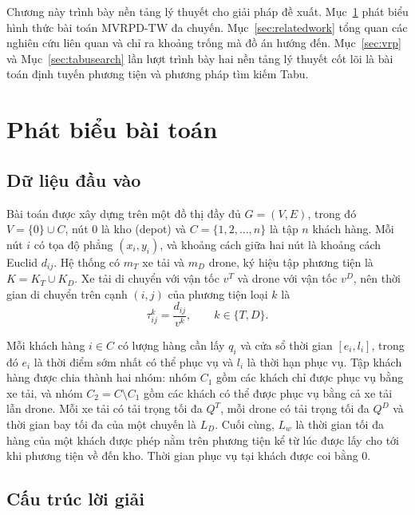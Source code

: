 \documentclass[../DoAn.tex]{subfiles}
\begin{document}
Chương này trình bày nền tảng lý thuyết cho giải pháp đề xuất. Mục~\ref{sec:ngucanh} phát biểu hình thức bài toán MVRPD-TW đa chuyến. Mục~\ref{sec:relatedwork} tổng quan các nghiên cứu liên quan và chỉ ra khoảng trống mà đồ án hướng đến. Mục~\ref{sec:vrp} và Mục~\ref{sec:tabusearch} lần lượt trình bày hai nền tảng lý thuyết cốt lõi là bài toán định tuyến phương tiện và phương pháp tìm kiếm Tabu.

\section{Phát biểu bài toán}
\label{sec:ngucanh}

\subsection{Dữ liệu đầu vào}

Bài toán được xây dựng trên một đồ thị đầy đủ $G = (V, E)$, trong đó $V = \{0\} \cup C$, nút $0$ là kho (depot) và $C = \{1, 2, \ldots, n\}$ là tập $n$ khách hàng. Mỗi nút $i$ có tọa độ phẳng $(x_i, y_i)$, và khoảng cách giữa hai nút là khoảng cách Euclid $d_{ij}$. Hệ thống có $m_T$ xe tải và $m_D$ drone, ký hiệu tập phương tiện là $K = K_T \cup K_D$. Xe tải di chuyển với vận tốc $v^T$ và drone với vận tốc $v^D$, nên thời gian di chuyển trên cạnh $(i, j)$ của phương tiện loại $k$ là
\begin{equation}
\tau^{k}_{ij} = \frac{d_{ij}}{v^{k}}, \qquad k \in \{T, D\}.
\label{eq:traveltime}
\end{equation}

Mỗi khách hàng $i \in C$ có lượng hàng cần lấy $q_i$ và cửa sổ thời gian $[e_i, l_i]$, trong đó $e_i$ là thời điểm sớm nhất có thể phục vụ và $l_i$ là thời hạn phục vụ. Tập khách hàng được chia thành hai nhóm: nhóm $C_1$ gồm các khách chỉ được phục vụ bằng xe tải, và nhóm $C_2 = C \setminus C_1$ gồm các khách có thể được phục vụ bằng cả xe tải lẫn drone. Mỗi xe tải có tải trọng tối đa $Q^T$, mỗi drone có tải trọng tối đa $Q^D$ và thời gian bay tối đa của một chuyến là $L_D$. Cuối cùng, $L_w$ là thời gian tối đa hàng của một khách được phép nằm trên phương tiện kể từ lúc được lấy cho tới khi phương tiện về đến kho. Thời gian phục vụ tại khách được coi bằng $0$.

\subsection{Cấu trúc lời giải}
\end{document}
